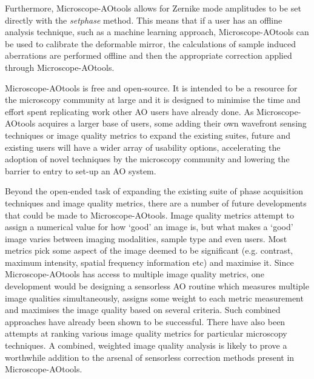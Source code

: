 Furthermore, Microscope-AOtools allows for Zernike mode amplitudes to be 
set directly with the \textit{set\textunderscore phase} method. This means 
that if a user has an offline analysis technique, such as a machine 
learning approach, Microscope-AOtools can be used to calibrate the 
deformable mirror, the calculations of sample induced aberrations are 
performed offline and then the appropriate correction applied through 
Microscope-AOtools.

Microscope-AOtools is free and open-source. It is intended to be a resource 
for the microscopy community at large and it is designed to minimise the 
time and effort spent replicating work other AO users have already done. As 
Microscope-AOtools acquires a larger base of users, some adding their own 
wavefront sensing techniques or image quality metrics to expand the 
existing suites, future and existing users will have a wider array of 
usability options, accelerating the adoption of novel techniques by the 
microscopy community and lowering the barrier to entry to set-up an AO 
system.

Beyond the open-ended task of expanding the existing suite of phase 
acquisition techniques and image quality metrics, there are a number of 
future developments that could be made to Microscope-AOtools. Image 
quality metrics attempt to assign a numerical value for how `good' an 
image is, but what makes a `good' image varies between imaging 
modalities, sample type and even users. Most metrics pick some aspect of 
the image deemed to be significant (e.g. contrast, maximum intensity, 
spatial frequency information etc) and maximise it. Since 
Microscope-AOtools has access to multiple image quality metrics, one 
development would be designing a sensorless AO routine which measures 
multiple image qualities simultaneously, assigns some weight to each 
metric measurement and maximises the image quality based on several 
criteria. Such combined approaches have already been shown to be 
successful\cite{gould2012adaptive}. There have also been attempts at 
ranking various image quality metrics for particular microscopy 
techniques\cite{koho2016image}. A combined, weighted image quality 
analysis is likely to prove a worthwhile addition to the arsenal of 
sensorless correction methods present in Microscope-AOtools.

